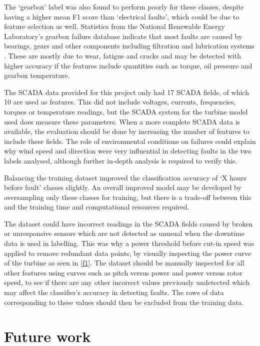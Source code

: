 The `gearbox' label was also found to perform poorly for these classes, despite having a higher mean F1 score than `electrical faults', which could be due to feature selection as well. Statistics from the National Renewable Energy Laboratory's gearbox failure database indicate that most faults are caused by bearings, gears and other components including filtration and lubrication systems \cite{Stati15}. These are mostly due to wear, fatigue and cracks \cite{Sheng11} and may be detected with higher accuracy if the features include quantities such as torque, oil pressure and gearbox temperature.

The SCADA data provided for this project only had 17 SCADA fields, of which 10 are used as features. This did not include voltages, currents, frequencies, torques or temperature readings, but the SCADA system for the turbine model used does measure these parameters. When a more complete SCADA data is available, the evaluation should be done by increasing the number of features to include these fields. The role of environmental conditions on failures could explain why wind speed and direction were very influential in detecting faults in the two labels analysed, although further in-depth analysis is required to verify this.

Balancing the training dataset improved the classification accuracy of `X hours before fault' classes slightly. An overall improved model may be developed by oversampling only these classes for training, but there is a trade-off between this and the training time and computational resources required.

The dataset could have incorrect readings in the SCADA fields caused by broken or unresponsive sensors which are not detected as unusual when the downtime data is used in labelling. This was why a power threshold before cut-in speed was applied to remove redundant data points, by visually inspecting the power curve of the turbine as seen in \autoref{f1}. The dataset should be manually inspected for all other features using curves such as pitch versus power and power versus rotor speed, to see if there are any other incorrect values previously undetected which may affect the classifier's accuracy in detecting faults. The rows of data corresponding to these values should then be excluded from the training data.

\section{Future work}

